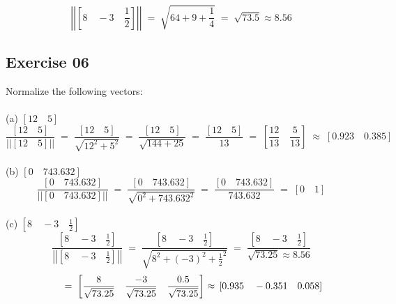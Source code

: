 \documentclass[12pt, a4paper]{article}
\begin{document}
\begin{equation}
	\tag*{}
	\left|\left| \left[ 8 \quad -3 \quad \frac{1}{2} \right]
	\right|\right| \; = \; \sqrt{64 + 9 + \frac{1}{4}} \; = \; \sqrt{73.5}
	\approx 8.56
\end{equation}

\subsection*{Exercise 06}
Normalize the following vectors:\\\\
(a) \quad $\left[12 \quad 5 \right]$\\

\begin{equation}
	\tag*{}	
	\frac
	{
		\left[12 \quad 5\right]
	}
	{
		\left|\left|\left[12 \quad 5\right]\right|\right|
	} \; = \;	
	\frac
	{
		\left[12 \quad 5\right]
	}
	{
		\sqrt{12^2 + 5^2}	
	} \; = \;
	\frac
	{
		\left[12 \quad 5\right]
	}
	{
		\sqrt{144 + 25}
	} \; = \;
	\frac
	{
		\left[12 \quad 5\right]
	}
	{
		13
	} \; = \;
	\left[
		\frac
		{
			12			
		}
		{
			13
		}
		\quad
		\frac
		{
			5		
		}
		{
			13
		}
	\right] \; \approx \;
	\left[0.923 \quad 0.385 \right]
\end{equation}\\
(b) \quad $\left[0 \quad 743.632 \right]$\\
\begin{equation}
	\tag*{}
	\frac
	{
		\left[0 \quad 743.632\right]
	}
	{
		\left|\left|\left[0 \quad 743.632\right]\right|\right|
	} \; = \;
	\frac
	{
		\left[0 \quad 743.632\right]
	}
	{
		\sqrt{0^2 + 743.632^2}
	} \; = \;
	\frac
	{
		\left[0 \quad 743.632\right]
	}
	{
		743.632
	} \; = \;
	\left[
		0 \quad 1	
	\right]
\end{equation}\\
(c) \quad $\left[8 \quad -3 \quad \frac{1}{2} \right]$\\
\begin{equation}
	\tag*{}
	\frac
	{
		\left[8 \quad -3 \quad \frac{1}{2}\right]
	}
	{
		\left|\left|\left[
		8 \quad -3 \quad \frac{1}{2}
		\right]\right|\right|
	} \; = \;
	\frac
	{
		\left[8 \quad -3 \quad \frac{1}{2}\right]
	}
	{
		\sqrt{8^2 + (-3)^2 + \frac{1}{2}^2}
	} \; = \;
	\frac
	{
		\left[8 \quad -3 \quad \frac{1}{2}\right]
	}
	{
		\sqrt{73.25} \approx 8.56
	}
\end{equation}
\begin{equation}
	\tag*{}
	\; = \;	
	\left[
		\frac{8}{\sqrt{73.25}}\quad
		\frac{-3}{\sqrt{73.25}}\quad
		\frac{0.5}{\sqrt{73.25}}
	\right]
	\approx\\
	\left[
		0.935 \quad -0.351 \quad 0.058
	\right]
\end{equation}
\end{document}
